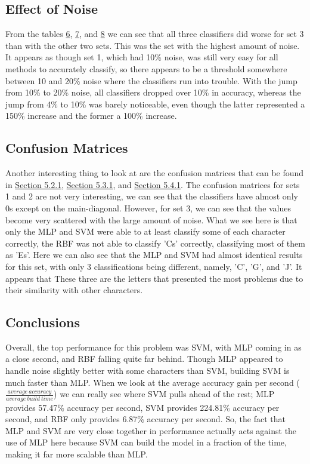 \documentclass{article}
\begin{document}
	\subsection{Effect of Noise}
		From the tables \hyperref[MLPAcc]{6}, \hyperref[SVMAcc]{7}, and \hyperref[RBFAcc]{8} we can see that all three classifiers did worse for set 3 than with the other two sets. This was the set with the highest amount of noise. It appears as though set 1, which had 10\% noise, was still very easy for all methods to accurately classify, so there appears to be a threshold somewhere between 10 and 20\% noise where the classifiers run into trouble. With the jump from 10\% to 20\% noise, all classifiers dropped over 10\% in accuracy, whereas the jump from 4\% to 10\% was barely noticeable, even though the latter represented a 150\% increase and the former a 100\% increase.\\
		
	
	\subsection{Confusion Matrices}
		Another interesting thing to look at are the confusion matrices that can be found in \hyperref[S521]{Section 5.2.1}, \hyperref[S531]{Section 5.3.1}, and \hyperref[S541]{Section 5.4.1}. The confusion matrices for sets 1 and 2 are not very interesting, we can see that the classifiers have almost only 0s except on the main-diagonal. However, for set 3, we can see that the values become very scattered with the large amount of noise. What we see here is that only the MLP and SVM were able to at least classify some of each character correctly, the RBF was not able to classify 'Cs' correctly, classifying most of them as 'Es'. Here we can also see that the MLP and SVM had almost identical results for this set, with only 3 classifications being different, namely, 'C', 'G', and 'J'. It appears that These three are the letters that presented the most problems due to their similarity with other characters. \\
		
	
	\subsection{Conclusions}
		Overall, the top performance for this problem was SVM, with MLP coming in as a close second, and RBF falling quite far behind. Though MLP appeared to handle noise slightly better with some characters than SVM, building SVM is much faster than MLP. When we look at the average accuracy gain per second ($\frac{average~accuracy}{average~build~time}$) we can really see where SVM pulls ahead of the rest; MLP provides 57.47\% accuracy per second, SVM provides 224.81\% accuracy per second, and RBF only provides 6.87\% accuracy per second. So, the fact that MLP and SVM are very close together in performance actually acts against the use of MLP here because SVM can build the model in a fraction of the time, making it far more scalable than MLP. \\
		
\end{document}
